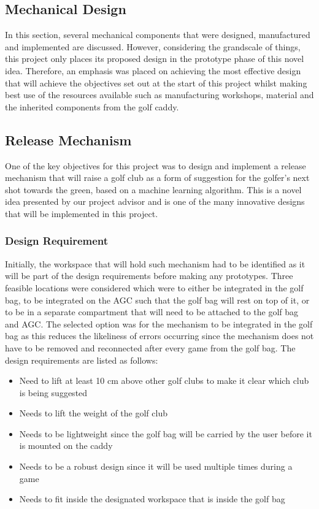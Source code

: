 \documentclass[11pt,landscape]{article}
\begin{document}
\begin{multicols}{2}

\section{Mechanical Design}
    In this section, several mechanical components that were designed,
    manufactured and implemented are discussed. However, considering the
    grandscale of things, this project only places its proposed design in the
    prototype phase of this novel idea. Therefore, an emphasis was placed on
    achieving the most effective design that will achieve the objectives set out
    at the start of this project whilst making best use of the resources
    available such as manufacturing workshops, material and the inherited
    components from the golf caddy. 
    
    \subsection{Release Mechanism}
    One of the key objectives for this project was to design and implement a
    release mechanism that will raise a golf club as a form of suggestion for
    the golfer’s next shot towards the green, based on a machine learning
    algorithm. This is a novel idea presented by our project advisor and is one
    of the many innovative designs that will be implemented in this project.
    
    \subsubsection{Design Requirement}
    Initially, the workspace that will hold such mechanism had to be identified
    as it will be part of the design requirements before making any prototypes.
    Three feasible locations were considered which were to either be integrated
    in the golf bag, to be integrated on the AGC such that the golf bag
    will rest on top of it, or to be in a separate compartment that will need to
    be attached to the golf bag and AGC. The selected option was for the
    mechanism to be integrated in the golf bag as this reduces the likeliness of
    errors occurring since the mechanism does not have to be removed and
    reconnected after every game from the golf bag. The design requirements are
    listed as follows:
    
    
    \begin{itemize}
    \item Need to lift at least 10 cm above other golf clubs to make it clear
    which club is being suggested
    \item Needs to lift the weight of the golf club
    \item Needs to be lightweight since the golf bag will be carried by the user
    before it is mounted on the caddy
    \item Needs to be a robust design since it will be used multiple times
    during a game
    \item Needs to fit inside the designated workspace that is inside the golf
    bag
    \end{itemize}
    

\end{multicols}
\end{document}
